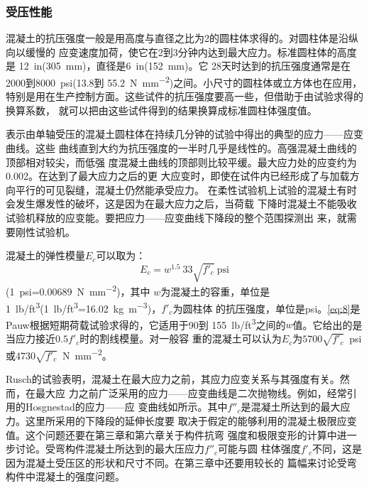 \documentclass[12pt,a4paper]{book}
\begin{document}
\subsubsection{受压性能}

混凝土的抗压强度一般是用高度与直径之比为2的圆柱体求得的。对圆柱体是沿纵向以缓慢的
应变速度加荷，使它在2到3分钟内达到最大应力。标准圆柱体的高度是
\SI{12}{in}(\SI{305}{\milli\meter})，直径是\SI{6}{in}(\SI{152}{\milli\meter})。它
28天时达到的抗压强度通常是在2000到\SI{8000}{psi}(13.8到
\SI{55.2}{\newton\per\square\milli\meter})之间。小尺寸的圆柱体或立方体也在应用，
特别是用在生产控制方面。这些试件的抗压强度要高一些，但借助于由试验求得的换算系数，
就可以把由这些试件得到的结果换算成标准圆柱体强度值。

表示由单轴受压的混凝土圆柱体在持续几分钟的试验中得出的典型的应力——应变曲线。这些
曲线直到大约为抗压强度的一半时几乎是线性的。高强混凝土曲线的顶部相对较尖，而低强
度混凝土曲线的顶部则比较平缓。最大应力处的应变约为0.002。在达到了最大应力之后的更
大应变时，即使在试件内已经形成了与加载方向平行的可见裂缝，混凝土仍然能承受应力。
在柔性试验机上试验的混凝土有时会发生爆发性的破坏，这是因为在最大应力之后，当荷载
下降时混凝土不能吸收试验机释放的应变能。要把应力——应变曲线下降段的整个范围探测出
来，就需要刚性试验机。

混凝土的弹性模量$E_c$可以取为：
\begin{equation}
  \label{eq:8} E_c=w^{1.5}\:33\sqrt{f'_c}\ \mathrm{psi}
\end{equation} (\SI{1}{psi}=\SI{0.00689}{\newton\per\square\milli\meter})，其中
$w$为混凝土的容重，单位是
\SI{1}{lb/ft^3}(\SI{1}{lb/ft^3}=\SI{16.02}{\kg\per\cubic\meter})，$f'_c$为圆柱体
的抗压强度，单位是psi。\cref{eq:8}是Pauw根据短期荷载试验求得的，它适用于90到
\SI{155}{lb/ft^3}之间的$w$值。它给出的是当应力接近$0.5f'_c$时的割线模量。对一般容
重的混凝土可以认为$E_c$为$5700\sqrt{f'_c}$\ psi或$4730\sqrt{f'_c}$\
\si{\newton\per\square\milli\meter}。

Rusch的试验表明，混凝土在最大应力之前，其应力应变关系与其强度有关。然而，在最大应
力之前广泛采用的应力——应变曲线是二次抛物线。例如，经常引用的Hosgnestad的应力——应
变曲线如所示。其中$f''_c$是混凝土所达到的最大应力。这里所采用的下降段的延伸长度要
取决于假定的能够利用的混凝土极限应变值。这个问题还要在第三章和第六章关于构件抗弯
强度和极限变形的计算中进一步讨论。受弯构件混凝土所达到的最大压应力$f''_c$可能与圆
柱体强度$f'_c$不同，这是因为混凝土受压区的形状和尺寸不同。在第三章中还要用较长的
篇幅来讨论受弯构件中混凝土的强度问题。
\end{document}
